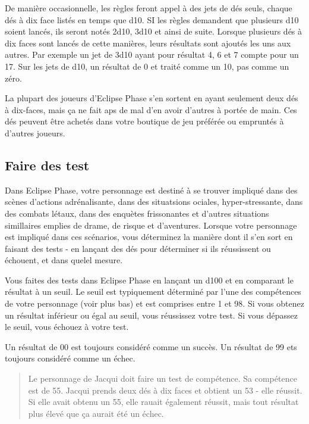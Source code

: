 De manière occasionnelle, les règles feront appel à des jets de dés seuls, chaque dés à dix face listés en temps que d10. SI les règles demandent que plusieurs d10 soient lancés, ils seront notés 2d10, 3d10 et ainsi de suite. Lorsque plusieurs dés à dix faces sont lancés de cette manières, leurs résultats sont ajoutés les uns aux autres. Par exemple un jet de 3d10 ayant pour résultat 4, 6 et 7 compte pour un 17. Sur les jets de d10, un résultat de 0 et traité comme un 10, pas comme un zéro. 

La plupart des joueurs d'Eclipse Phase s'en sortent en ayant seulement deux dés à dix-faces, mais ça ne fait aps de mal d'en avoir d'autres à portée de main. Ces dés peuvent être achetés dans votre boutique de jeu préférée ou empruntés à d'autres joueurs. 

\subsection{Faire des test} \label{sec:making-tests} 

Dans Eclipse Phase, votre personnage est destiné à se trouver impliqué dans des scènes d'actions adrénalisante, dans des situatsions ociales, hyper-stressante, dans des combats létaux, dans des enquètes frissonantes et d'autres situations simillaires emplies de drame, de risque et d'aventures. Lorsque votre personnage est impliqué dans ces scénarios, vous déterminez la manière dont il s'en sort en faisant des tests - en lançant des dés pour déterminer si ils réussissent ou échouent, et dans quelel mesure. 

Vous faites des tests dans Eclipse Phase en lançant un d100 et en comparant le résultat à un seuil. Le seuil est typiquement déterminé par l'une des compétences de votre personnage (voir plus bas) et est comprises entre 1 et 98. Si vous obtenez un résultat inférieur ou égal au seuil, vous réussissez votre test. Si vous dépassez le seuil, vous échouez à votre test. 

Un résultat de 00 est toujours considéré comme un succès. Un résultat de 99 ets toujours considéré comme un échec. 

\begin{quotation} Le personnage de Jacqui doit faire un test de compétence. Sa compétence est de 55. Jacqui prends deux dés à dix faces et obtient un 53 - elle réussit. Si elle avait obtenu un 55, elle rauait également réussit, mais tout résultat plus élevé que ça aurait été un échec. \end{quotation} 


